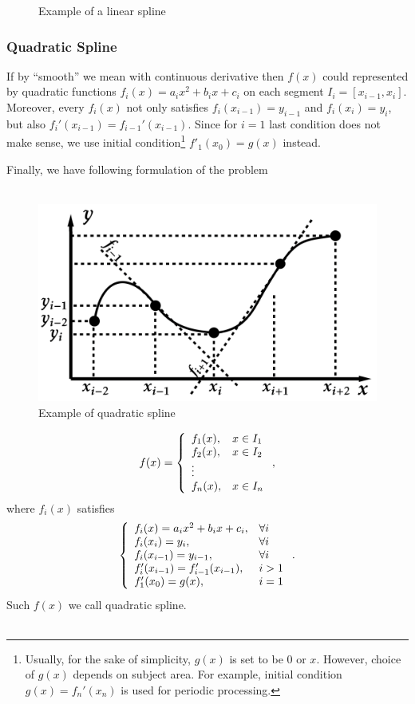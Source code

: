 \begin{figure}[H]
\begin{tikzpicture}[x=0.75pt,y=0.75pt,yscale=-1,xscale=1]
        
        \end{tikzpicture}    
        \caption*{Example of a linear spline}   
\end{figure}

\subsubsection*{Quadratic Spline}
If by ``smooth'' we mean with continuous derivative then $f(x)$ could represented by quadratic functions $f_i(x)=a_ix^2+b_ix+c_i$ on each segment $I_i = [x_{i-1}, x_i]$. Moreover, every $f_i(x)$ not only satisfies $f_i(x_{i-1})=y_{i-1}$ and $f_i(x_{i})=y_i$, but also $f_i'(x_{i-1})=f_{i-1}'(x_{i-1})$. Since for $i=1$ last condition does not make sense, we use initial condition\footnote{Usually, for the sake of simplicity, $g(x)$ is set to be $0$ or $x$. However, choice of $g(x)$ depends on subject area. For example, initial condition $g(x)=f_n'(x_n)$ is used for periodic processing.} $f'_1(x_{0}) = g(x)$ instead. 
\newpage

Finally, we have following formulation of the problem~ ~ ~ ~ ~ ~ ~ ~ ~ ~ ~ ~ ~ ~ ~ ~ ~ ~ ~ ~ 
\begin{figure}
    \includegraphics[width=0.55\columnwidth]{lectures/images/quadratic_spline.png}
    \caption*{Example of quadratic spline}
\end{figure}
\[
    f(x) = 
    \left\{ 
    \begin{array}{l l}
        f_1(x), & x \in I_1\\
        f_2(x), & x \in I_2\\
        \vdots \\
        f_n(x), & x \in I_n
    \end{array}
    \right.,
\]
where $f_i(x)$ satisfies
\[
    \left\{
    \begin{array}{l l}
        f_i(x) = a_ix^2+b_ix+c_i, & \forall i\\
        f_i(x_i) = y_i, & \forall i\\
        f_i(x_{i-1}) = y_{i-1}, & \forall i\\
        f'_i(x_{i-1}) = f'_{i-1}(x_{i-1}), & i>1\\
        f'_1(x_{0}) = g(x), & i=1\\
    \end{array}  
    \right..
\]
Such $f(x)$ we call quadratic spline. 
\\\\
